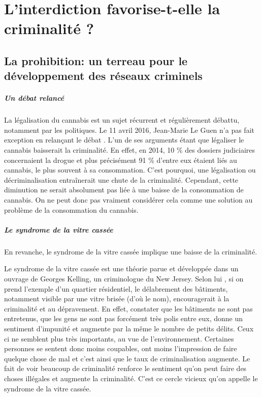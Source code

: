 \chapter{L'interdiction favorise-t-elle la criminalité ?}

	\section{La prohibition: un terreau pour le développement des réseaux criminels}

\paragraph{Un débat relancé}

    La légalisation du cannabis est un sujet récurrent et régulièrement débattu, notamment par les politiques. Le 11 avril 2016, Jean-Marie Le Guen n’a pas fait exception en relançant le débat \cite{leguen16}. L’un de ses arguments étant que légaliser le cannabis baisserait la criminalité. En effet, en 2014, 10 \% des dossiers judiciaires concernaient la drogue et plus précisément 91 \% d’entre eux étaient liés au cannabis, le plus souvent à sa consommation. C’est pourquoi, une légalisation ou décriminalisation entraînerait une chute de la criminalité. Cependant, cette diminution ne serait absolument pas liée à une baisse de la consommation de cannabis. On ne peut donc pas vraiment considérer cela comme une solution au problème de la consommation du cannabis.

\paragraph{Le syndrome de la vitre cassée}

    En revanche, le syndrome de la vitre cassée implique une baisse de la criminalité.

    Le syndrome de la vitre cassée est une théorie parue et développée dans un ouvrage de Georges Kelling, un criminologue du New Jersey. Selon lui \cite{wikiVitreBrisee}, si on prend l’exemple d’un quartier résidentiel, le délabrement des bâtiments, notamment visible par une vitre brisée (d’où le nom), encouragerait à la criminalité et au dépravement. En effet, constater que les bâtiments ne sont pas entretenus, que les gens ne sont pas forcément très polis entre eux, donne un sentiment d’impunité et augmente par la même le nombre de petits délits. Ceux ci ne semblent plus très importants, au vue de l’environnement. Certaines personnes se sentent donc moins coupables, ont moins l’impression de faire quelque chose de mal et c’est ainsi que le taux de criminalisation augmente. Le fait de voir beaucoup de criminalité renforce le sentiment qu’on peut faire des choses illégales et augmente la criminalité. C’est ce cercle vicieux qu’on appelle le syndrome de la vitre cassée.

